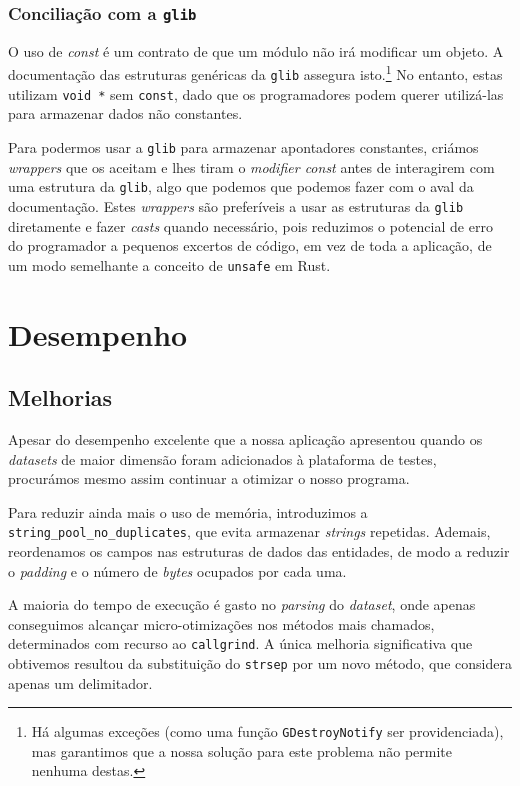 \documentclass[11pt, a4paper]{article}
\begin{document}
\subsubsection{Conciliação com a \texttt{glib}}
\label{sec:glib-conciliation}

O uso de \emph{const} é um contrato de que um módulo não irá modificar um objeto. A documentação das
estruturas genéricas da \texttt{glib} assegura isto.\footnote{Há algumas exceções (como uma função
\texttt{GDestroyNotify} ser providenciada), mas garantimos que a nossa solução para este problema
não permite nenhuma destas.} No entanto, estas utilizam \texttt{void *} sem \texttt{const}, dado
que os programadores podem querer utilizá-las para armazenar dados não constantes.

Para podermos usar a \texttt{glib} para armazenar apontadores constantes, criámos \emph{wrappers}
que os aceitam e lhes tiram o \emph{modifier const} antes de interagirem com uma estrutura da
\texttt{glib}, algo que podemos que podemos fazer com o aval da documentação. Estes \emph{wrappers}
são preferíveis a usar as estruturas da \texttt{glib} diretamente e fazer \emph{casts} quando
necessário, pois reduzimos o potencial de erro do programador a pequenos excertos de código, em
vez de toda a aplicação, de um modo semelhante a conceito de \texttt{unsafe} em Rust.

\section{Desempenho}
\label{sec:performance}

\subsection{Melhorias}
\label{sec:performance-improvements}

Apesar do desempenho excelente que a nossa aplicação apresentou quando os \emph{datasets} de maior
dimensão foram adicionados à plataforma de testes, procurámos mesmo assim continuar a otimizar o
nosso programa.

Para reduzir ainda mais o uso de memória, introduzimos a \texttt{string\_pool\_no\_duplicates}, que
evita armazenar \emph{strings} repetidas. Ademais, reordenamos os campos nas estruturas de dados das
entidades, de modo a reduzir o \emph{padding} e o número de \emph{bytes} ocupados por cada uma.

A maioria do tempo de execução é gasto no \emph{parsing} do \emph{dataset}, onde apenas conseguimos
alcançar micro-otimizações nos métodos mais chamados, determinados com recurso ao
\texttt{callgrind}. A única melhoria significativa que obtivemos resultou da substituição do
\texttt{strsep} por um novo método, que considera apenas um delimitador.
\end{document}
